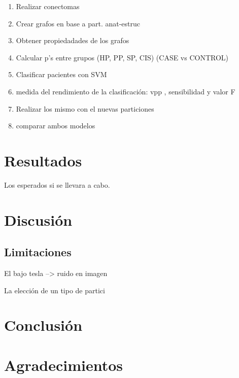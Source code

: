 \documentclass[fleqn,10pt]{UICArticle} %
\begin{document}
\begin{enumerate}[noitemsep]
\item Realizar conectomas
\item Crear grafos en base a part. anat-estruc
\item Obtener propiedadades de los grafos
\item Calcular p's entre grupos (HP, PP, SP, CIS) (CASE vs CONTROL) %
\item Clasificar pacientes con SVM
\item medida del rendimiento de la clasificación: vpp , sensibilidad y valor F
\item Realizar los mismo con el nuevas particiones
\item comparar ambos modelos
\end{enumerate}

\section{Resultados}
Los esperados si se llevara a cabo.

\section{Discusión}

\subsection{Limitaciones}

\begin{list}{-}{spacing}
\item El bajo tesla --> ruido en imagen
\item La elección de un tipo de partici
\end{list}

\section{Conclusión}


\section*{Agradecimientos}





\end{document}
